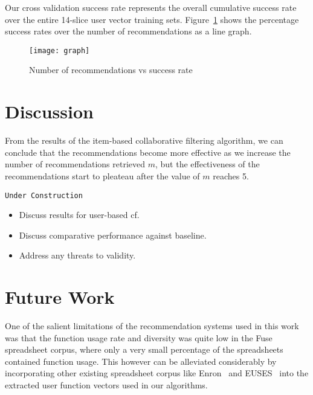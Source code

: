 \documentclass{article} %
\begin{document}
Our cross validation success rate represents the overall cumulative success rate over the entire 14-slice user vector training sets. Figure~\ref{fig:results} shows the percentage success rates over the number of recommendations as a line graph.

\begin{figure}[h]
\begin{center}
\texttt{[image: graph]}
\end{center}
\caption{Number of recommendations vs success rate}
\label{fig:results}
\end{figure}

\section{Discussion}
From the results of the item-based collaborative filtering algorithm, we can conclude that the recommendations become more effective as we increase the number of recommendations retrieved $m$, but the effectiveness of the recommendations start to pleateau after the value of $m$ reaches 5.
\begin{center}
   \texttt{Under Construction}
   \begin{itemize}
      \item Discuss results for user-based cf.
      \item Discuss comparative performance against baseline.
      \item Address any threats to validity.
   \end{itemize}
\end{center}

\section{Future Work}
One of the salient limitations of the recommendation systems used in this work was that the function usage rate and diversity was quite low in the Fuse spreadsheet corpus, where only a very small percentage of the spreadsheets contained function usage. This however can be alleviated considerably by incorporating other existing spreadsheet corpus like Enron~\cite{hermans2014enron} and EUSES~\cite{fisher2005euses} into the extracted user function vectors used in our algorithms.
\end{document}
